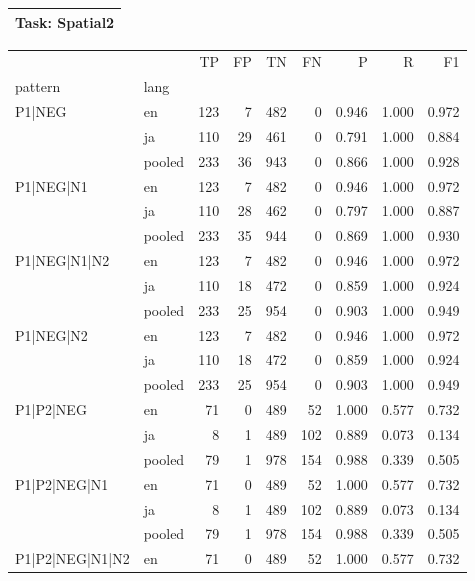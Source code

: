 
\begin{table}[h!]
\centering
\begin{tabular}{p{}}
\toprule
\textbf{Task: Spatial2} \\
\midrule
\end{tabular}
\vspace{10pt}
\begin{tabular}{llrrrrrrr}
\toprule
 &  & TP & FP & TN & FN & P & R & F1 \\
pattern & lang &  &  &  &  &  &  &  \\
\midrule
\multirow[t]{3}{*}{P1|NEG} & en & 123 & 7 & 482 & 0 & 0.946 & 1.000 & 0.972 \\
 & ja & 110 & 29 & 461 & 0 & 0.791 & 1.000 & 0.884 \\
 & pooled & 233 & 36 & 943 & 0 & 0.866 & 1.000 & 0.928 \\
\cline{1-9}
\multirow[t]{3}{*}{P1|NEG|N1} & en & 123 & 7 & 482 & 0 & 0.946 & 1.000 & 0.972 \\
 & ja & 110 & 28 & 462 & 0 & 0.797 & 1.000 & 0.887 \\
 & pooled & 233 & 35 & 944 & 0 & 0.869 & 1.000 & 0.930 \\
\cline{1-9}
\multirow[t]{3}{*}{P1|NEG|N1|N2} & en & 123 & 7 & 482 & 0 & 0.946 & 1.000 & 0.972 \\
 & ja & 110 & 18 & 472 & 0 & 0.859 & 1.000 & 0.924 \\
 & pooled & 233 & 25 & 954 & 0 & 0.903 & 1.000 & 0.949 \\
\cline{1-9}
\multirow[t]{3}{*}{P1|NEG|N2} & en & 123 & 7 & 482 & 0 & 0.946 & 1.000 & 0.972 \\
 & ja & 110 & 18 & 472 & 0 & 0.859 & 1.000 & 0.924 \\
 & pooled & 233 & 25 & 954 & 0 & 0.903 & 1.000 & 0.949 \\
\cline{1-9}
\multirow[t]{3}{*}{P1|P2|NEG} & en & 71 & 0 & 489 & 52 & 1.000 & 0.577 & 0.732 \\
 & ja & 8 & 1 & 489 & 102 & 0.889 & 0.073 & 0.134 \\
 & pooled & 79 & 1 & 978 & 154 & 0.988 & 0.339 & 0.505 \\
\cline{1-9}
\multirow[t]{3}{*}{P1|P2|NEG|N1} & en & 71 & 0 & 489 & 52 & 1.000 & 0.577 & 0.732 \\
 & ja & 8 & 1 & 489 & 102 & 0.889 & 0.073 & 0.134 \\
 & pooled & 79 & 1 & 978 & 154 & 0.988 & 0.339 & 0.505 \\
\cline{1-9}
\multirow[t]{3}{*}{P1|P2|NEG|N1|N2} & en & 71 & 0 & 489 & 52 & 1.000 & 0.577 & 0.732 \\

\end{tabular}
\end{table}
